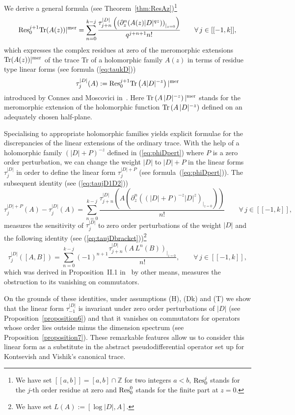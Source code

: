 \documentclass[pdftex]{sigma}
\def \Z {\mathbb Z}
\numberwithin{equation}{section}
\begin{document}
 We derive a  general formula (see Theorem~\ref{thm:ResAz})\footnote{We have set    $ [[a,b]]= [a, b]\cap \Z$ for two integers $a<b$, ${\rm Res}^j_0$ stands for the $j$-th order
  residue at zero and ${\rm Res}_0^0$ stands for the f\/inite part at $z=0$.}
\[
{\rm Res}^{j+1}_{0} {\rm Tr}(A(z))\vert^{\rm mer}= \sum_{n=0}^{k-j}
\frac{\tau_{j+n}^{\vert D\vert}\left(\left(\partial_z^n (A(z)
  \vert D\vert^{q  z})\right)_{\vert_{z=0}}\right)}{q^{j+n+1}  n!}\qquad \forall\,
  j\in[[-1,k]],
\]
which expresses the complex residues
at zero of the meromorphic extensions ${\rm Tr}(A(z))\vert^{\rm
  mer}$ of the trace Tr of a holomorphic
family $A(z)$  in terms of residue type linear forms (see formula
(\ref{eq:taukD}))
\[ \tau^{\vert D\vert}_j(A):={\rm Res}^{j+1}_{0} {\rm
    Tr} \left( A  \vert D\vert^{-z}\right)\vert^{\rm mer}
    \]
introduced by Connes and
Moscovici in~\cite{CoMo}. Here  $ {\rm
    Tr} \left( A\, \vert D\vert^{-z}\right)\vert^{\rm mer}$
stands for  the meromorphic  extension of the holomorphic function
    ${\rm Tr} \left( A\, \vert D\vert^{-z}\right)$   def\/ined      on an
    adequately chosen  half-plane.

     Specialising to appropriate holomorphic families
yields explicit formulae for the discrepancies of the linear extensions of the
ordinary trace.  With the help of a holomorphic family
$(\vert D\vert+P)^{-z}$ def\/ined in (\ref{eq:phiDpert}) where $P$ is a
zero order perturbation, we can change the weight $\vert D\vert$ to
 $\vert D\vert+P$ in the linear forms $\tau_j^{\vert D\vert}$
  in order to def\/ine the linear form $\tau_j^{\vert D\vert +P}$ (see formula~(\ref{eq:phiDpert})).
  The subsequent identity (see
(\ref{eq:taujD1D2}))
\[
\tau_j^{\vert D\vert +P}(A)-\tau_j^{\vert D\vert}(A)= \sum_{n=0}^{k-j}
\frac{\tau_{j+n}^{\vert D\vert}\left( A \left(\partial_z^n((\vert D\vert+P)^{-z} \vert
    D\vert^z)_{\vert_{z=0}}\right)\right)}{n!}\qquad \forall\,
  j\in[[-1,k]],
  \]
 measures the sensitivity  of
$\tau_j^{\vert D\vert}$ to zero order perturbations   of the weight
$\vert D\vert$ and the following identity
(see
(\ref{eq:taujDbracket}))\footnote{We have set $L(A):= [\log \vert D\vert, A]$.}
\[
\tau_j^{\vert D\vert}([A,B])=\sum_{n= 0}^{k-j}
 (-1)^{n+1}\frac{\tau_{j+n}^{\vert D\vert}\left(
    A\,L^n(B)\right)_{\vert_{z=0}}}{n!},\qquad \forall\,
  j\in[[-1,k]],
  \]  which was derived in
Proposition~II.1 in~\cite{CoMo} by other means,  measures the obstruction to
its vanishing on commutators.


On the grounds of these identities, under assumptions (H), (Dk) and (T) we show that the  linear form
$\tau_{-1}^{\vert D\vert}$  is invariant under zero order perturbations of
$\vert D\vert$ (see Proposition~\ref{proposition6}) and that it vanishes on commutators for operators
whose order lies outside minus the dimension spectrum (see Proposition~\ref{proposition7}). These remarkable features  allow us to
consider this linear form as a substitute in the abstract pseudodif\/ferential operator set up
for Kontsevish and Vishik's canonical trace.
\end{document}

